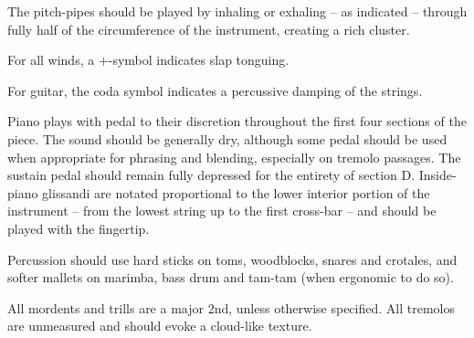 \documentclass[10pt]{article}
\begin{document}
\begin{textblock}{11}
The pitch-pipes should be played by inhaling or exhaling -- as indicated --
through fully half of the circumference of the instrument, creating a rich
cluster.

For all winds, a +-symbol indicates slap tonguing.

For guitar, the coda symbol indicates a percussive damping of the strings.

Piano plays with pedal to their discretion throughout the first four sections
of the piece. The sound should be generally dry, although some pedal should be
used when appropriate for phrasing and blending, especially on tremolo
passages. The sustain pedal should remain fully depressed for the entirety of
section D. Inside-piano glissandi are notated proportional to the lower
interior portion of the instrument -- from the lowest string up to the first
cross-bar -- and should be played with the fingertip.

Percussion should use hard sticks on toms, woodblocks, snares and crotales, and
softer mallets on marimba, bass drum and tam-tam (when ergonomic to do so).

All mordents and trills are a major 2nd, unless otherwise specified. All
tremolos are unmeasured and should evoke a cloud-like texture.

\end{textblock}
\end{document}
